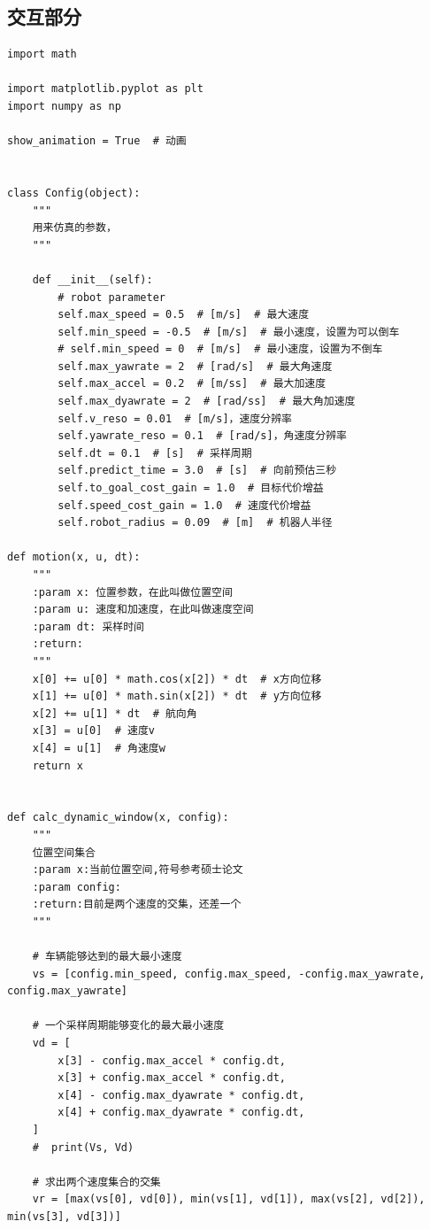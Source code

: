 \subsection{交互部分}
\begin{verbatim}
import math

import matplotlib.pyplot as plt
import numpy as np

show_animation = True  # 动画


class Config(object):
    """
    用来仿真的参数，
    """

    def __init__(self):
        # robot parameter
        self.max_speed = 0.5  # [m/s]  # 最大速度
        self.min_speed = -0.5  # [m/s]  # 最小速度，设置为可以倒车
        # self.min_speed = 0  # [m/s]  # 最小速度，设置为不倒车
        self.max_yawrate = 2  # [rad/s]  # 最大角速度
        self.max_accel = 0.2  # [m/ss]  # 最大加速度
        self.max_dyawrate = 2  # [rad/ss]  # 最大角加速度
        self.v_reso = 0.01  # [m/s]，速度分辨率
        self.yawrate_reso = 0.1  # [rad/s]，角速度分辨率
        self.dt = 0.1  # [s]  # 采样周期
        self.predict_time = 3.0  # [s]  # 向前预估三秒
        self.to_goal_cost_gain = 1.0  # 目标代价增益
        self.speed_cost_gain = 1.0  # 速度代价增益
        self.robot_radius = 0.09  # [m]  # 机器人半径

def motion(x, u, dt):
    """
    :param x: 位置参数，在此叫做位置空间
    :param u: 速度和加速度，在此叫做速度空间
    :param dt: 采样时间
    :return:
    """
    x[0] += u[0] * math.cos(x[2]) * dt  # x方向位移
    x[1] += u[0] * math.sin(x[2]) * dt  # y方向位移
    x[2] += u[1] * dt  # 航向角
    x[3] = u[0]  # 速度v
    x[4] = u[1]  # 角速度w
    return x


def calc_dynamic_window(x, config):
    """
    位置空间集合
    :param x:当前位置空间,符号参考硕士论文
    :param config:
    :return:目前是两个速度的交集，还差一个
    """

    # 车辆能够达到的最大最小速度
    vs = [config.min_speed, config.max_speed, -config.max_yawrate, config.max_yawrate]

    # 一个采样周期能够变化的最大最小速度
    vd = [
        x[3] - config.max_accel * config.dt,
        x[3] + config.max_accel * config.dt,
        x[4] - config.max_dyawrate * config.dt,
        x[4] + config.max_dyawrate * config.dt,
    ]
    #  print(Vs, Vd)

    # 求出两个速度集合的交集
    vr = [max(vs[0], vd[0]), min(vs[1], vd[1]), max(vs[2], vd[2]), min(vs[3], vd[3])]


\end{verbatim}
